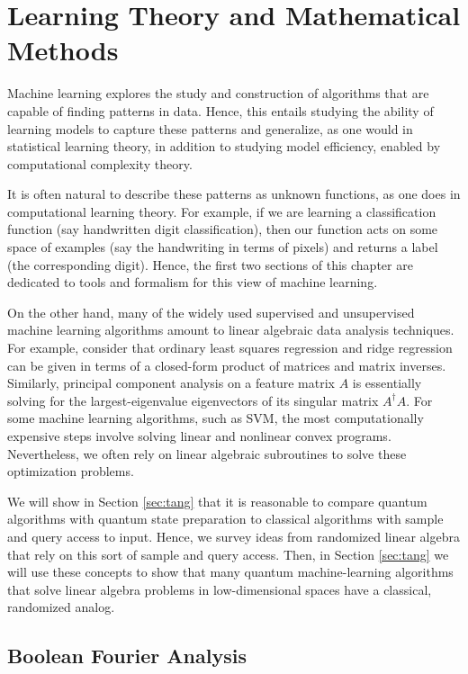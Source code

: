 \documentclass[main.tex]{subfiles}
\begin{document}
\chapter{Learning Theory and Mathematical Methods}

Machine learning explores the study and construction of algorithms that are capable of finding patterns in data. Hence, this entails studying the ability of learning models to capture these patterns and generalize, as one would in statistical learning theory, in addition to studying model efficiency, enabled by computational complexity theory.

It is often natural to describe these patterns as unknown functions, as one does in computational learning theory. For example, if we are learning a classification function (say handwritten digit classification), then our function acts on some space of examples (say the handwriting in terms of pixels) and returns a label (the corresponding digit). Hence, the first two sections of this chapter are dedicated to tools and formalism for this view of machine learning.

On the other hand, many of the widely used supervised and unsupervised machine learning algorithms amount to linear algebraic data analysis techniques. For example, consider that ordinary least squares regression and ridge regression can be given in terms of a closed-form product of matrices and matrix inverses. Similarly, principal component analysis on a feature matrix $A$ is essentially solving for the largest-eigenvalue eigenvectors of its singular matrix $A^\dag A$. For some machine learning algorithms, such as SVM, the most computationally expensive steps involve solving linear and nonlinear convex programs. Nevertheless, we often rely on linear algebraic subroutines to solve these optimization problems.

We will show in Section \ref{sec:tang} that it is reasonable to compare quantum algorithms with quantum state preparation to classical algorithms with sample and query access to input. Hence, we survey ideas from randomized linear algebra that rely on this sort of sample and query access. Then, in Section \ref{sec:tang} we will use these concepts to show that many quantum machine-learning algorithms that solve linear algebra problems in low-dimensional spaces have a classical, randomized analog.

\section{Boolean Fourier Analysis}
\label{sec:bfa}
\end{document}
